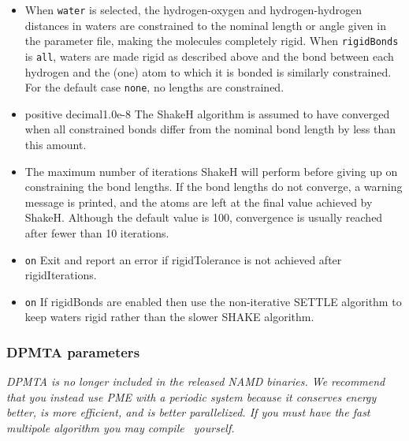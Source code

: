 \begin{itemize}
\item
{} 
{When {\tt water} is selected, the hydrogen-oxygen and hydrogen-hydrogen
distances in waters are constrained to the nominal length or angle given
in the parameter file, making the molecules completely rigid.
When {\tt rigidBonds} is {\tt all}, waters are made rigid as described above
and the bond between each hydrogen and the (one) atom to which
it is bonded is similarly constrained.
For the default case {\tt none}, no lengths are constrained.
}

\item
{}
{positive decimal}{1.0e-8}
{
The ShakeH algorithm is assumed to have converged when all constrained
bonds differ from the nominal bond length by less than this amount.
}

\item
{}
{
The maximum number of iterations ShakeH will perform before giving up
on constraining the bond lengths.  If the bond lengths do not
converge, a warning message is printed, and the atoms are left at the
final value achieved by ShakeH.  
Although the default value is 100, 
convergence is usually reached after fewer than 10 iterations.
}

\item
{}
{{\tt on}}
{
Exit and report an error if rigidTolerance is not achieved after rigidIterations.
}

\item
{}
{{\tt on}}
{
If rigidBonds are enabled then use the non-iterative SETTLE algorithm to
keep waters rigid rather than the slower SHAKE algorithm.
}


\end{itemize}

\subsubsection{DPMTA parameters}

{\em DPMTA is no longer included in the released NAMD binaries.
We recommend that you instead use PME with a periodic system because
it conserves energy better, is more efficient, and is better parallelized.
If you must have the fast multipole algorithm you may compile \NAMD\ yourself.} 

